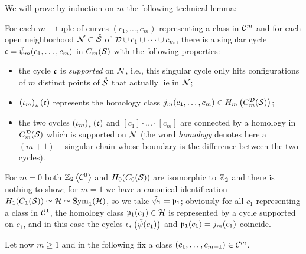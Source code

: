 We will prove by induction on $m$ the following technical lemma:

\begin{lem}
 \label{lem:tpsiwithproperties}
For each $m-$tuple of curves $(c_1,\dots,c_m)$ representing a class in $\cC^m$
and for each open neighborhood $\N\subset\mrS$ of
$\D\cup c_1\cup\dots\cup c_m$, there is a singular cycle $\fc=\tpsi_m(c_1,\dots,c_m)$
in $\cms$ with the following properties:
\begin{itemize}
 \item the cycle $\fc$ is \emph{supported} on $\N$, i.e.,
this singular cycle only hits configurations of $m$ distinct points of $\mrS$ that actually lie in $\N$;
\item $\pa{\iota_m}_*(\fc)$ represents the homology class $\j_m(c_1,\dots,c_m)\in H_m\pa{\cmsD}$;
\item the two cycles $\pa{\iota_m}_*(\fc)$ and $[c_1]\cdot\ldots\cdot[c_m]$
are connected by a homology in $\cmsD$ which is supported on $\N$ (the word
\emph{homology} denotes here a $(m+1)-$singular chain whose boundary is the difference between the two cycles).
\end{itemize}
\end{lem}

For $m=0$ both $\ZcC{0}$ and $H_0(C_0(\S))$ are
isomorphic to $\Z_2$ and there is nothing to show; for $m=1$
we have a canonical identification $H_1(C_1(\S))\simeq\H\simeq\Sym_1(\H)$, so we take $\tpsi_1=\pr_1$;
obviously for all $c_1$ representing a class in $\cC^1$, the homology class $\pr_1(c_1)\in\H$
is represented by a cycle supported on $c_1$,
and in this case the cycles $\iota_*\pa{\tpsi(c_1)}$ and $\pr_1(c_1)=\j_m(c_1)$ coincide.

Let now $m\geq 1$ and in the following fix a class $(c_1,\dots, c_{m+1})\in\cC^m$.

